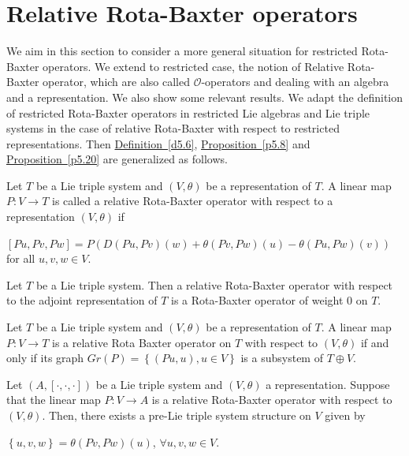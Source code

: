 \documentclass[11pt, twoside]{article}
\begin{document}
\section{Relative Rota-Baxter operators}\label{s6}
We aim in this section to consider a more general situation for restricted Rota-Baxter operators. We extend to restricted case, the notion of Relative Rota-Baxter operator, which are also called $\mathcal{O}$-operators and dealing with an algebra and a representation. We also show some relevant results. 
We  adapt the definition of  restricted Rota-Baxter operators in restricted Lie algebras and Lie triple systems in the case of relative Rota-Baxter with respect to restricted representations. Then \hyperref[d5.6]{Definition~\ref*{d5.6}}, \hyperref[p5.8]{Proposition~\ref*{p5.8}} and \hyperref[p5.20]{Proposition~\ref*{p5.20}} are generalized as follows.

\begin{defi}
    Let $T$ be a Lie triple system and $(V,\theta)$ be a representation of $T$. A linear map $P:V\to T $ is called a relative Rota-Baxter operator with respect to a representation $(V,\theta)$ if \begin{center}
        $[P u,P v,P w]=P (D(P u,P v)(w)+\theta(P v,P w)(u)- \theta(P u,P w)(v)) $ for all $u,v,w\in V$.
    \end{center}
\end{defi}

\begin{ex}
    Let $T$ be a Lie triple system. Then a relative Rota-Baxter operator with respect to the adjoint representation of $T$ is a Rota-Baxter operator of weight $0$ on $T$.
\end{ex}

\begin{prop}
    Let $T$ be a Lie triple system and $(V,\theta)$ be a representation of $T$. A linear map $P:V\to T$ is a relative Rota Baxter operator on $T$ with respect to $(V,\theta) $ if and only if its graph $Gr(P)= \left\{ (P u,u), u\in V\right\} $ is a subsystem of $T\oplus V $.
\end{prop}

\begin{prop}[\cite{M21}]
    Let $(A,[\cdot,\cdot,\cdot]) $ be a Lie triple system and $(V,\theta) $ a representation. Suppose that the linear map $P:V\to A$ is a relative Rota-Baxter operator with respect  to $(V,\theta)$. Then, there exists a pre-Lie triple system structure on $V$ given by \begin{center}
        $\left\{ u,v,w\right\} = \theta(Pv,Pw)(u)$, $\forall u,v,w\in V $.
    \end{center} 
\end{prop}
\end{document}
